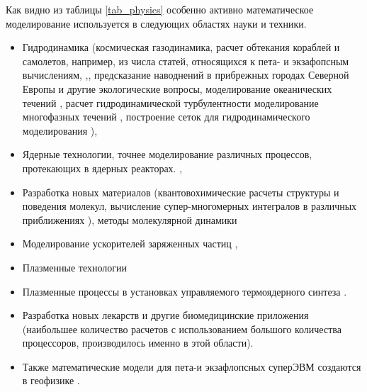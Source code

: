 Как видно из таблицы \ref{tab_physics} особенно активно математическое моделирование используется в следующих областях науки и техники.  
\begin{itemize}
	\item Гидродинамика (космическая газодинамика, расчет обтекания кораблей и самолетов, например, из числа статей, относящихся к пета- и экзафопсным вычислениям, \cite{Onishi2014},\cite{Lu2015,Peterson1989}, предсказание наводнений в прибрежных городах Северной Европы и другие экологические вопросы, моделирование океанических течений \cite{STERN20151,Newman20152086,Reuter2015325,Walker2014287}, расчет гидродинамической турбулентности %
	\cite{Mininni2011316,Appeloe201019,Yokota2013445,Tucker2016,Kotov2016189}  моделирование многофазных течений \cite{Safi2016170,Zaspel2016505}, построение сеток для гидродинамического моделирования \cite{Shang2013381,Yilmaz2013388,Ono20142336,Yilmaz2013773}),
	\item Ядерные технологии, точнее моделирование различных процессов, протекающих в ядерных реакторах. \cite{Romano2013274,Romano201320,Romano201590,Boyd201443,Gong2012588,Gong20116010,Bergmann2015176,Bauge201432}, 
	\item Разработка новых материалов (квантовохимические расчеты структуры и поведения молекул, вычисление супер-многомерных интегралов в различных приближениях \cite{Ono2015}), методы молекулярной динамики \cite{Valiev20101477,Aguilar20132197,Yokota201317,Ohno20142575,Xu2015200}
	\item Моделирование ускорителей заряженных частиц \cite{Silva2014229}, 
	\item Плазменные технологии\cite{BirdsallIEEE}
	\item Плазменные процессы в установках управляемого термоядерного синтеза
	\cite{KatesHarbeck2016231,Winkel2015456,Minoshima201381,Kumar20132251,Decyk2014,Acebron2013224}. 
	\item Разработка новых лекарств и другие биомедицинские приложения \cite{Stone2015,Joshi2011200,Saraladevi2015596,Blau20132856,Wang2012254,Markram201139,Markowitz2015730} (наибольшее количество расчетов с использованием большого количества процессоров, производилось именно в этой области). 
	
	\item Также математические модели для пета-и экзафлопсных суперЭВМ создаются в геофизике \cite{Christen2012956,Nakajima20131265,Zhong2015197,Reed20131,Hodges201316,Furumura20111448}.
\end{itemize}

